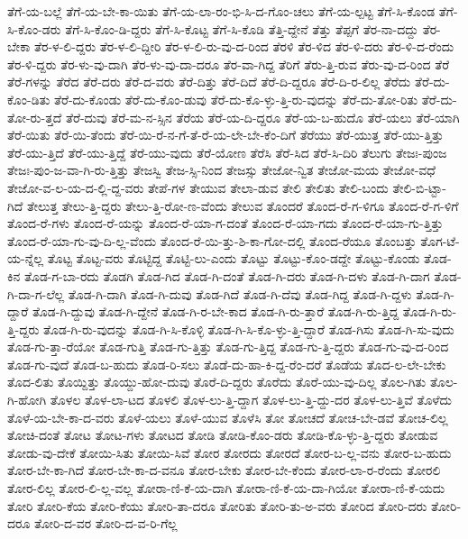 {ತೆಗೆ-ಯ-ಬಲ್ಲೆ
ತೆಗೆ-ಯ-ಬೇ-ಕಾ-ಯಿತು
ತೆಗೆ-ಯ-ಲಾ-ರಂ-ಭಿ-ಸಿ-ದ-ಗೊಂ-ಚಲು
ತೆಗೆ-ಯ-ಲ್ಪಟ್ಟ
ತೆಗೆ-ಸಿ-ಕೊಂಡ
ತೆಗೆ-ಸಿ-ಕೊಂ-ಡರು
ತೆಗೆ-ಸಿ-ಕೊಂ-ಡಿ-ದ್ದರು
ತೆಗೆ-ಸಿ-ಕೊಟ್ಟ
ತೆಗೆ-ಸಿ-ಕೊಡಿ
ತೆತ್ತಿ-ದ್ದೇನೆ
ತೆತ್ತು
ತೆಪ್ಪಗೆ
ತೆರ-ನಾ-ದದ್ದು
ತೆರ-ಬೇಕಾ
ತೆರ-ಳ-ಲಿ-ದ್ದರು
ತೆರ-ಳ-ಲಿ-ದ್ದೀರಿ
ತೆರ-ಳ-ಲಿ-ರು-ವು-ದ-ರಿಂದ
ತೆರಳಿ
ತೆರ-ಳಿದ
ತೆರ-ಳಿ-ದರು
ತೆರ-ಳಿ-ದ-ರೆಂದು
ತೆರ-ಳಿ-ದ್ದರು
ತೆರ-ಳು-ವು-ದಾಗಿ
ತೆರ-ಳು-ವು-ದಾ-ದರೂ
ತೆರ-ವಾ-ಗಿದ್ದ
ತೆರಿಗೆ
ತೆರು-ತ್ತಿ-ರುವ
ತೆರು-ವು-ದ-ರಿಂದ
ತೆರೆ
ತೆರೆ-ಗಳನ್ನು
ತೆರೆದ
ತೆರೆ-ದರು
ತೆರೆ-ದ-ವರು
ತೆರೆ-ದಿತ್ತು
ತೆರೆ-ದಿದೆ
ತೆರೆ-ದಿ-ದ್ದರೂ
ತೆರೆ-ದಿ-ರ-ಲಿಲ್ಲ
ತೆರೆದು
ತೆರೆ-ದು-ಕೊಂ-ಡಿತು
ತೆರೆ-ದು-ಕೊಂಡು
ತೆರೆ-ದು-ಕೊಂ-ಡುವು
ತೆರೆ-ದು-ಕೊ-ಳ್ಳು-ತ್ತಿ-ರು-ವುದನ್ನು
ತೆರೆ-ದು-ತೋ-ರಿತು
ತೆರೆ-ದು-ತೋ-ರು-ತ್ತದೆ
ತೆರೆ-ದುವು
ತೆರೆ-ಮ-ನ-ಸ್ಸಿನ
ತೆರೆಯ
ತೆರೆ-ಯ-ದಿ-ದ್ದರೂ
ತೆರೆ-ಯ-ಬ-ಹುದೊ
ತೆರೆ-ಯಲು
ತೆರೆ-ಯಾಗಿ
ತೆರೆ-ಯಿತು
ತೆರೆ-ಯಿ-ತೆಂದು
ತೆರೆ-ಯಿ-ರೆ-ನ-ಗೆ-ತೆ-ರೆ-ಯ-ಲೇ-ಬೇ-ಕೆಂ-ದಿಗೆ
ತೆರೆಯು
ತೆರೆ-ಯುತ್ತ
ತೆರೆ-ಯು-ತ್ತಿತ್ತು
ತೆರೆ-ಯು-ತ್ತಿದೆ
ತೆರೆ-ಯು-ತ್ತಿದ್ದೆ
ತೆರೆ-ಯು-ವುದು
ತೆರೆ-ಯೋಣ
ತೆರೆಸಿ
ತೆರೆ-ಸಿದ
ತೆರೆ-ಸಿ-ದಿರಿ
ತೆಲುಗು
ತೇಜಃ-ಪುಂಜ
ತೇಜಃ-ಪುಂ-ಜ-ವಾ-ಗಿ-ರು-ತ್ತಿತ್ತು
ತೇಜಸ್ವಿ
ತೇಜ-ಸ್ಸಿ-ನಿಂದ
ತೇಜಸ್ಸು
ತೇಜೋ-ನ್ವಿತ
ತೇಜೋ-ಮಯ
ತೇಜೋ-ವಧೆ
ತೇಜೋ-ವ-ಲ-ಯ-ದ-ಲ್ಲಿ-ದ್ದ-ವರು
ತೇಪೆ-ಗಳ
ತೇಯುವ
ತೇಲಾ-ಡುವ
ತೇಲಿ
ತೇಲಿತು
ತೇಲಿ-ಬಂದು
ತೇಲಿ-ಬಿ-ಟ್ಟಾ-ಗಿದೆ
ತೇಲುತ್ತ
ತೇಲು-ತ್ತಿ-ದ್ದರು
ತೇಲು-ತ್ತಿ-ರೋ-ಣ-ವೆಂದು
ತೇಲುವ
ತೊಂದರೆ
ತೊಂದ-ರೆ-ಗ-ಳಿಗೂ
ತೊಂದ-ರೆ-ಗ-ಳಿಗೆ
ತೊಂದ-ರೆ-ಗಳು
ತೊಂದ-ರೆ-ಯನ್ನು
ತೊಂದ-ರೆ-ಯಾ-ಗ-ದಂತೆ
ತೊಂದ-ರೆ-ಯಾ-ಗದು
ತೊಂದ-ರೆ-ಯಾ-ಗು-ತ್ತಿತ್ತು
ತೊಂದ-ರೆ-ಯಾ-ಗು-ವು-ದಿ-ಲ್ಲ-ವೆಂದು
ತೊಂದ-ರೆ-ಯಿ-ತ್ತು-ಶಿ-ಕಾ-ಗೋ-ದಲ್ಲಿ
ತೊಂದ-ರೆಯೂ
ತೊಂಬತ್ತು
ತೊಗ-ಟೆ-ಯ-ನ್ನೆಲ್ಲ
ತೊಟ್ಟ
ತೊಟ್ಟ-ವರು
ತೊಟ್ಟಿದ್ದ
ತೊಟ್ಟಿ-ಲು-ಎಂದು
ತೊಟ್ಟು
ತೊಟ್ಟು-ಕೊಂ-ಡದ್ದೇ
ತೊಟ್ಟು-ಕೊಂಡು
ತೊಡ-ಕಿನ
ತೊಡ-ಗ-ಬಾ-ರದು
ತೊಡಗಿ
ತೊಡ-ಗಿದ
ತೊಡ-ಗಿ-ದಂತೆ
ತೊಡ-ಗಿ-ದರು
ತೊಡ-ಗಿ-ದಳು
ತೊಡ-ಗಿ-ದಾಗ
ತೊಡ-ಗಿ-ದಾ-ಗ-ಲೆಲ್ಲ
ತೊಡ-ಗಿ-ದಾಗಿ
ತೊಡ-ಗಿ-ದುವು
ತೊಡ-ಗಿದೆ
ತೊಡ-ಗಿ-ದೆವು
ತೊಡ-ಗಿದ್ದ
ತೊಡ-ಗಿ-ದ್ದಳು
ತೊಡ-ಗಿ-ದ್ದಾರೆ
ತೊಡ-ಗಿ-ದ್ದುವು
ತೊಡ-ಗಿ-ದ್ದೇನೆ
ತೊಡ-ಗಿ-ರ-ಬೇ-ಕಾದ
ತೊಡ-ಗಿ-ರು-ತ್ತಾರೆ
ತೊಡ-ಗಿ-ರು-ತ್ತಿದ್ದ
ತೊಡ-ಗಿ-ರು-ತ್ತಿ-ದ್ದರು
ತೊಡ-ಗಿ-ರು-ವುದನ್ನು
ತೊಡ-ಗಿ-ಸಿ-ಕೊಳ್ಳಿ
ತೊಡ-ಗಿ-ಸಿ-ಕೊ-ಳ್ಳು-ತ್ತಿ-ದ್ದಾರೆ
ತೊಡ-ಗಿಸು
ತೊಡ-ಗಿ-ಸು-ವುದು
ತೊಡ-ಗು-ತ್ತಾ-ರೆಯೋ
ತೊಡ-ಗುತ್ತಿ
ತೊಡ-ಗು-ತ್ತಿತ್ತು
ತೊಡ-ಗು-ತ್ತಿದ್ದ
ತೊಡ-ಗು-ತ್ತಿ-ದ್ದರು
ತೊಡ-ಗು-ವು-ದ-ರಿಂದ
ತೊಡ-ಗು-ವುದೆ
ತೊಡ-ಬ-ಹುದು
ತೊಡ-ರಿ-ಸಲು
ತೊಡೆ-ದು-ಹಾ-ಕಿ-ದ್ದ-ರೆಂ-ದರೆ
ತೊಡೆಯ
ತೊದ-ಲ-ಲೇ-ಬೇಕು
ತೊದ-ಲಿತು
ತೊಯ್ದಿತ್ತು
ತೊಯ್ದು-ಹೋ-ದುವು
ತೊರೆ-ದಿ-ದ್ದರು
ತೊರೆದು
ತೊರೆ-ಯು-ವು-ದಿಲ್ಲ
ತೊಲ-ಗಿತು
ತೊಲ-ಗಿ-ಹೋಗಿ
ತೊಳಲ
ತೊಳ-ಲಾ-ಟದ
ತೊಳಲಿ
ತೊಳ-ಲು-ತ್ತಿ-ದ್ದಾಗ
ತೊಳ-ಲು-ತ್ತಿ-ದ್ದು-ದರ
ತೊಳ-ಲು-ತ್ತಿವೆ
ತೊಳೆದು
ತೊಳೆ-ಯ-ಬೇ-ಕಾ-ದ-ವರು
ತೊಳೆ-ಯಲು
ತೊಳೆ-ಯುವ
ತೊಳೆಸಿ
ತೋ
ತೋಚದೆ
ತೋಚ-ಬೇ-ಡವೆ
ತೋಚ-ಲಿಲ್ಲ
ತೋಚಿ-ದಂತೆ
ತೋಟ
ತೋಟ-ಗಳು
ತೋಟದ
ತೋಡಿ
ತೋಡಿ-ಕೊಂ-ಡರು
ತೋಡಿ-ಕೊ-ಳ್ಳು-ತ್ತಿ-ದ್ದರು
ತೋಡುವ
ತೋಡು-ವು-ದೇಕೆ
ತೋಯಿ-ಸಿತು
ತೋಯಿ-ಸಿವೆ
ತೋರ
ತೋರದು
ತೋರದೆ
ತೋರ-ಬ-ಲ್ಲ-ವನು
ತೋರ-ಬ-ಹುದು
ತೋರ-ಬೇ-ಕಾ-ಗಿದೆ
ತೋರ-ಬೇ-ಕಾ-ದ-ವನೂ
ತೋರ-ಬೇಕು
ತೋರ-ಬೇ-ಕೆಂದು
ತೋರ-ಲಾ-ರ-ರೆಂದು
ತೋರಲಿ
ತೋರ-ಲಿಲ್ಲ
ತೋರ-ಲಿ-ಲ್ಲ-ವಲ್ಲ
ತೋರಾ-ಣಿ-ಕೆ-ಯ-ದಾಗಿ
ತೋರಾ-ಣಿ-ಕೆ-ಯ-ದಾ-ಗಿಯೋ
ತೋರಾ-ಣಿ-ಕೆ-ಯದು
ತೋರಿ
ತೋರಿ-ಕೆಯ
ತೋರಿ-ಕೆಯು
ತೋರಿ-ತಾ-ದರೂ
ತೋರಿತು
ತೋರಿ-ತು-ಅ-ವರು
ತೋರಿದ
ತೋರಿ-ದರು
ತೋರಿ-ದರೂ
ತೋರಿ-ದ-ವರ
ತೋರಿ-ದ-ವ-ರಿ-ಗೆಲ್ಲ
}
